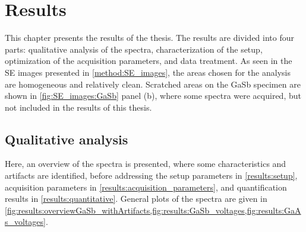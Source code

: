 \chapter{Results}
\label{ch:results}




This chapter presents the results of the thesis.
The results are divided into four parts: qualitative analysis of the spectra, characterization of the setup, optimization of the acquisition parameters, and data treatment.
As seen in the SE images presented in \cref{method:SE_images}, the areas chosen for the analysis are homogeneous and relatively clean.
Scratched areas on the GaSb specimen are shown in \cref{fig:SE_images:GaSb} panel (b), where some spectra were acquired, but not included in the results of this thesis.



\section{Qualitative analysis}
\label{results:qualitative_analysis}

Here, an overview of the spectra is presented, where some characteristics and artifacts are identified, before addressing the setup parameters in \cref{results:setup}, acquisition parameters in \cref{results:acquisition_parameters}, and quantification results in \cref{results:quantitative}.
General plots of the spectra are given in \cref{fig:results:overviewGaSb_withArtifacts,fig:results:GaSb_voltages,fig:results:GaAs_voltages}.



